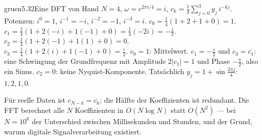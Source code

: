 \begin{loesungkarte}{gruen}{5.32}{Eine DFT von Hand}
$N = 4$, $\omega = e^{2\pi i/4} = i$, $c_k = \frac14\sum_{j=0}^{3}y_j\,i^{-kj}$. Potenzen: $i^{0} = 1$, $i^{-1} = -i$, $i^{-2} = -1$, $i^{-3} = i$.
$c_0 = \frac14(1 + 2 + 1 + 0) = 1$. \\
$c_1 = \frac14(1 + 2(-i) + 1(-1) + 0) = \frac14(-2i) = -\frac i2$. \\
$c_2 = \frac14(1 + 2(-1) + 1(1) + 0) = 0$. \\
$c_3 = \frac14(1 + 2(i) + 1(-1) + 0) = \frac i2$.
$c_0 = 1$: Mittelwert. $c_1 = -\frac i2$ und $c_3 = \overline{c_1}$: eine Schwingung der Grundfrequenz mit Amplitude $2|c_1| = 1$ und Phase $-\frac\pi2$, also ein Sinus. $c_2 = 0$: keine Nyquist-Komponente. Tatsächlich $y_j = 1 + \sin\frac{2\pi j}4$: $1, 2, 1, 0$. \checkmark
{}
\begin{mitnehmen}\kastentext
Für reelle Daten ist $c_{N-k} = \overline{c_k}$; die Hälfte der Koeffizienten ist redundant. Die FFT berechnet alle $N$ Koeffizienten in $O(N\log N)$ statt $O(N^{2})$ --- bei $N = 10^{6}$ der Unterschied zwischen Millisekunden und Stunden, und der Grund, warum digitale Signalverarbeitung existiert.
\end{mitnehmen}
\end{loesungkarte}

